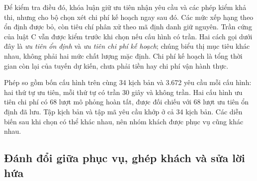 Để kiểm tra điều đó, khóa luận giữ ưu tiên nhận yêu cầu và các phép kiểm khả thi, nhưng cho bộ chọn xét chi phí
kế hoạch ngay sau đó. Các mức xếp hạng theo ổn định được bỏ, còn tiêu chí phân xử theo mã định danh giữ nguyên.
Trần cứng của luật C vẫn được kiểm trước khi chọn nếu cấu hình có trần. Hai cách gọi dưới đây là \emph{ưu tiên
ổn định} và \emph{ưu tiên chi phí kế hoạch}; chúng biểu thị mục tiêu khác nhau, không phải hai mức chất lượng
mặc định. Chi phí kế hoạch là tổng thời gian còn lại của tuyến dự kiến, chưa phải tiền hay chi phí vận hành thực.

Phép so gồm bốn cấu hình trên cùng 34 kịch bản và 3.672 yêu cầu mỗi cấu hình: hai thứ tự ưu tiên, mỗi thứ tự có
trần 30 giây và không trần. Hai cấu hình ưu tiên chi phí có 68 lượt mô phỏng hoàn tất, được đối chiếu với 68 lượt
ưu tiên ổn định đã lưu. Tập kịch bản và tập mã yêu cầu khớp ở cả 34 kịch bản. Các diễn biến sau khi chọn có thể
khác nhau, nên nhóm khách được phục vụ cũng khác nhau.

\subsection{Đánh đổi giữa phục vụ, ghép khách và sửa lời hứa}

